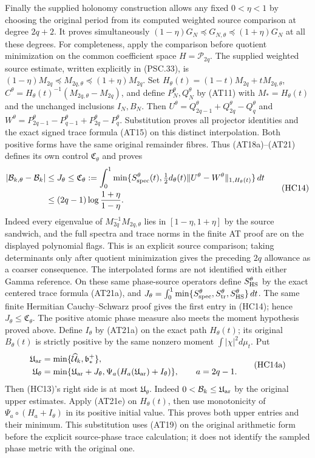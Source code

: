 Finally the supplied holonomy construction allows any fixed
$0<\eta<1$ by choosing the original period from its computed weighted
source comparison at degree $2q+2$.  It proves simultaneously
$(1-\eta)G_N\preceq G_{N,\theta}\preceq(1+\eta)G_N$ at all these
degrees.  For completeness, apply the comparison before quotient
minimization on the common coefficient space $H=\mathcal P_{2q}$.
The supplied weighted source estimate, written explicitly in (PSC.33),
is $(1-\eta)M_{2q}\preceq M_{2q,\theta}\preceq(1+\eta)M_{2q}$.
Set $H_\theta(t)=(1-t)M_{2q}+tM_{2q,\theta}$,
$C^\theta=H_\theta(t)^{-1}(M_{2q,\theta}-M_{2q})$, and define
$P_N^\theta,Q_N^\theta$ by (AT11) with $M_*=H_\theta(t)$ and
the unchanged inclusions $I_N,B_N$. Then
$U^\theta=Q_{2q-1}^\theta+Q_{2q}^\theta-Q_q^\theta$ and
$W^\theta=P_{2q-1}^\theta-P_{q-1}^\theta+P_{2q}^\theta-P_q^\theta$.
Substitution proves all projector identities and the exact signed
trace formula (AT15) on this distinct interpolation. Both positive
forms have the same original remainder fibres. Thus (AT18a)--(AT21)
defines its own control $\mathfrak C_\theta$ and proves
\[
\begin{aligned}
 |\mathcal B_{k,\theta}-\mathcal B_k|
 &\le J_\theta\le\mathfrak C_\theta
 :=\int_0^1\min\{S_{\rm spec}^\theta(t),
        \tfrac12d_\theta(t)\|U^\theta-W^\theta\|_{1,H_\theta(t)}\}\,dt\\
 &\le(2q-1)\log\frac{1+\eta}{1-\eta}.
\end{aligned}\tag{HC14}
\]
Indeed every eigenvalue of $M_{2q}^{-1}M_{2q,\theta}$ lies in
$[1-\eta,1+\eta]$ by the source sandwich, and the full spectra
and trace norms in the finite AT proof are on the displayed
polynomial flags. This is an explicit source comparison; taking
determinants only after quotient minimization gives the preceding
$2q$ allowance as a coarser consequence. The interpolated forms
are not identified with either Gamma reference.
On these same phase-source operators define
$S_{\rm HS}^\theta$ by the exact centered trace formula (AT21a),
and $J_\theta=\int_0^1\min\{S_{\rm spec}^\theta,
S_{\rm tr}^\theta,S_{\rm HS}^\theta\}\,dt$.
The same finite Hermitian Cauchy--Schwarz proof gives the first
entry in (HC14); hence $J_\theta\le\mathfrak C_\theta$.
The positive atomic phase measure also meets the moment hypothesis
proved above. Define $I_\theta$ by (AT21a) on the exact path
$H_\theta(t)$; its original $B_\theta(t)$ is strictly positive by
the same nonzero moment $\int|\chi|^2d\mu_t$. Put
\[
\begin{aligned}
\mathfrak U_{\rm ar}&=\min\{\widehat{\mathcal U}_k,\mathfrak b_*^+\},\\
\mathfrak U_\theta&=\min\{\mathfrak U_{\rm ar}+J_\theta,
 \Psi_a(H_a(\mathfrak U_{\rm ar})+I_\theta)\},\qquad a=2q-1.
\end{aligned}\tag{HC14a}
\]
Then (HC13)'s right side is at most $\mathfrak U_\theta$.
Indeed $0<\mathcal B_k\le\mathfrak U_{\rm ar}$ by the original
upper estimates. Apply (AT21e) on $H_\theta(t)$, then use
monotonicity of $\Psi_a\circ(H_a+I_\theta)$ in its positive
initial value. This proves both upper entries and their minimum.
This substitution uses (AT19) on the original arithmetic form
before the explicit source-phase trace calculation; it does not identify
the sampled phase metric with the original one.

